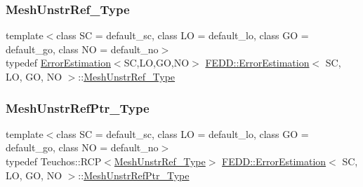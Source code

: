 \mbox{\label{classFEDD_1_1ErrorEstimation_a3203c49d7cd9ee1089dde9ef83d17c58}} 
\subsubsection{\texorpdfstring{Mesh\+Unstr\+Ref\+\_\+\+Type}{MeshUnstrRef\_Type}}
{\footnotesize\ttfamily template$<$class SC  = default\+\_\+sc, class LO  = default\+\_\+lo, class GO  = default\+\_\+go, class NO  = default\+\_\+no$>$ \\
typedef \hyperlink{classFEDD_1_1ErrorEstimation}{Error\+Estimation}$<$SC,LO,GO,NO$>$ \hyperlink{classFEDD_1_1ErrorEstimation}{F\+E\+D\+D\+::\+Error\+Estimation}$<$ SC, LO, GO, NO $>$\+::\hyperlink{classFEDD_1_1ErrorEstimation_a3203c49d7cd9ee1089dde9ef83d17c58}{Mesh\+Unstr\+Ref\+\_\+\+Type}}

\mbox{\label{classFEDD_1_1ErrorEstimation_a541e398a65d9618f8f316a941b57f5cb}} 
\subsubsection{\texorpdfstring{Mesh\+Unstr\+Ref\+Ptr\+\_\+\+Type}{MeshUnstrRefPtr\_Type}}
{\footnotesize\ttfamily template$<$class SC  = default\+\_\+sc, class LO  = default\+\_\+lo, class GO  = default\+\_\+go, class NO  = default\+\_\+no$>$ \\
typedef Teuchos\+::\+R\+CP$<$\hyperlink{classFEDD_1_1ErrorEstimation_a3203c49d7cd9ee1089dde9ef83d17c58}{Mesh\+Unstr\+Ref\+\_\+\+Type}$>$ \hyperlink{classFEDD_1_1ErrorEstimation}{F\+E\+D\+D\+::\+Error\+Estimation}$<$ SC, LO, GO, NO $>$\+::\hyperlink{classFEDD_1_1ErrorEstimation_a541e398a65d9618f8f316a941b57f5cb}{Mesh\+Unstr\+Ref\+Ptr\+\_\+\+Type}}

\mbox{\label{classFEDD_1_1ErrorEstimation_a007f3451c1ea266178a87e3649f29e97}} 
